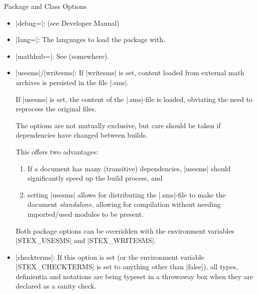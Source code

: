 \documentclass{stex}
\begin{document}
\begin{sfragment}{Package and Class Options}
  
    \begin{itemize}
      \item|debug=|: (see Developer Manual)
      \item|lang=|: The languages to load the 
        package with.
      \item|mathhub=|: See (somewhere).
      \item|usesms|/|writesms|:
        If |writesms| is set, content loaded from external math archives 
        is persisted in the file |.sms|.

        If |usesms| is set, the content of the
        |.sms|-file is loaded, obviating the need to reprocess
        the original files.

        The options are not mutually exclusive, but care should be taken
        if dependencies have changed between builds.

        This offers two advantages:
        \begin{enumerate}
          \item If a document has many (transitive) dependencies, |usesms|
            should significantly speed up the build process, and
          \item setting |usesms| allows for distributing the |.sms|-file
            to make the document \emph{standalone}, allowing for compilation
            without needing imported/used modules to be present. 
        \end{enumerate}

        Both package options can be overridden with the environment
        variables |STEX_USESMS| and |STEX_WRITESMS|.
      \item|checkterms|: If this option is set (or the environment variable
        |STEX_CHECKTERMS| is set to anything other than |false|), all
        types, definientia and notations are being typeset in a throwaway
        box when they are declared as a sanity check.


\end{itemize}
\end{sfragment}
\end{document}
